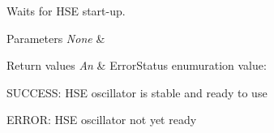 Waits for H\+SE start-\/up. 


\begin{DoxyParams}{Parameters}
{\em None} & \\
\hline
\end{DoxyParams}

\begin{DoxyRetVals}{Return values}
{\em An} & Error\+Status enumuration value\+:
\begin{DoxyItemize}
\item S\+U\+C\+C\+E\+SS\+: H\+SE oscillator is stable and ready to use
\item E\+R\+R\+OR\+: H\+SE oscillator not yet ready 
\end{DoxyItemize}\\
\hline
\end{DoxyRetVals}
